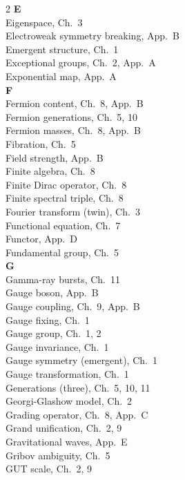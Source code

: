 \documentclass[11pt,a4paper,openright]{book}
\theoremstyle{plain}
\theoremstyle{definition}
\begin{document}
\begin{multicols}{2}
\textbf{E}\\[2pt]
Eigenspace, Ch.~3\\
Electroweak symmetry breaking, App.~B\\
Emergent structure, Ch.~1\\
Exceptional groups, Ch.~2, App.~A\\
Exponential map, App.~A\\[4pt]

\textbf{F}\\[2pt]
Fermion content, Ch.~8, App.~B\\
Fermion generations, Ch.~5, 10\\
Fermion masses, Ch.~8, App.~B\\
Fibration, Ch.~5\\
Field strength, App.~B\\
Finite algebra, Ch.~8\\
Finite Dirac operator, Ch.~8\\
Finite spectral triple, Ch.~8\\
Fourier transform (twin), Ch.~3\\
Functional equation, Ch.~7\\
Functor, App.~D\\
Fundamental group, Ch.~5\\[4pt]

\textbf{G}\\[2pt]
Gamma-ray bursts, Ch.~11\\
Gauge boson, App.~B\\
Gauge coupling, Ch.~9, App.~B\\
Gauge fixing, Ch.~1\\
Gauge group, Ch.~1, 2\\
Gauge invariance, Ch.~1\\
Gauge symmetry (emergent), Ch.~1\\
Gauge transformation, Ch.~1\\
Generations (three), Ch.~5, 10, 11\\
Georgi-Glashow model, Ch.~2\\
Grading operator, Ch.~8, App.~C\\
Grand unification, Ch.~2, 9\\
Gravitational waves, App.~E\\
Gribov ambiguity, Ch.~5\\
GUT scale, Ch.~2, 9\\[4pt]


\end{multicols}
\end{document}

